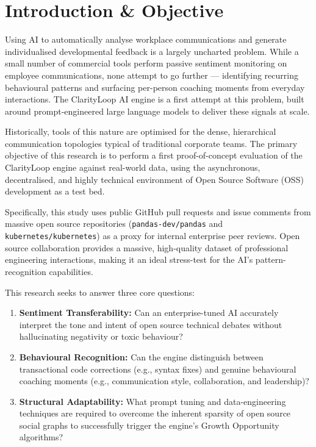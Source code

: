 \documentclass[conference]{IEEEconf}
\begin{document}
\IEEEpeerreviewmaketitle

\section{Introduction \& Objective}
Using AI to automatically analyse workplace communications and generate individualised developmental feedback is a largely uncharted problem. While a small number of commercial tools perform passive sentiment monitoring on employee communications, none attempt to go further --- identifying recurring behavioural patterns and surfacing per-person coaching moments from everyday interactions. The ClarityLoop AI engine is a first attempt at this problem, built around prompt-engineered large language models to deliver these signals at scale.

Historically, tools of this nature are optimised for the dense, hierarchical communication topologies typical of traditional corporate teams. The primary objective of this research is to perform a first proof-of-concept evaluation of the ClarityLoop engine against real-world data, using the asynchronous, decentralised, and highly technical environment of Open Source Software (OSS) development as a test bed.

Specifically, this study uses public GitHub pull requests and issue comments from massive open source repositories (\texttt{pandas-dev/pandas} and \texttt{kubernetes/kubernetes}) as a proxy for internal enterprise peer reviews. Open source collaboration provides a massive, high-quality dataset of professional engineering interactions, making it an ideal stress-test for the AI's pattern-recognition capabilities.

This research seeks to answer three core questions:
\begin{enumerate}
	\item \textbf{Sentiment Transferability:} Can an enterprise-tuned AI accurately interpret the tone and intent of open source technical debates without hallucinating negativity or toxic behaviour?
	\item \textbf{Behavioural Recognition:} Can the engine distinguish between transactional code corrections (e.g., syntax fixes) and genuine behavioural coaching moments (e.g., communication style, collaboration, and leadership)?
	\item \textbf{Structural Adaptability:} What prompt tuning and data-engineering techniques are required to overcome the inherent sparsity of open source social graphs to successfully trigger the engine's Growth Opportunity algorithms?
\end{enumerate}
\end{document}
